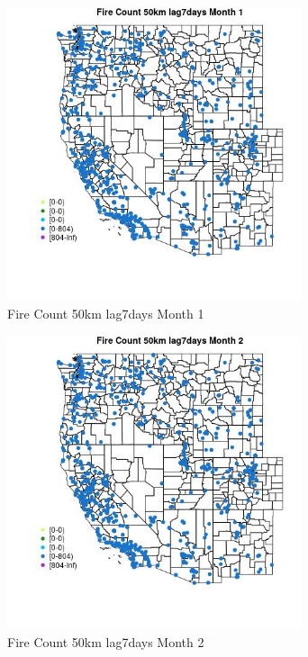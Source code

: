 \begin{figure} 
\centering  
\includegraphics[width=0.77\textwidth]{Code_Outputs/Report_ML_input_PM25_Step4_part_f_de_duplicated_aveswNAs_MapObsMo1Fire_Count_50km_lag7days.jpg} 
\caption{\label{fig:Report_ML_input_PM25_Step4_part_f_de_duplicated_aveswNAsMapObsMo1Fire_Count_50km_lag7days}Fire Count 50km lag7days Month 1} 
\end{figure} 
 

\begin{figure} 
\centering  
\includegraphics[width=0.77\textwidth]{Code_Outputs/Report_ML_input_PM25_Step4_part_f_de_duplicated_aveswNAs_MapObsMo2Fire_Count_50km_lag7days.jpg} 
\caption{\label{fig:Report_ML_input_PM25_Step4_part_f_de_duplicated_aveswNAsMapObsMo2Fire_Count_50km_lag7days}Fire Count 50km lag7days Month 2} 
\end{figure} 
 

